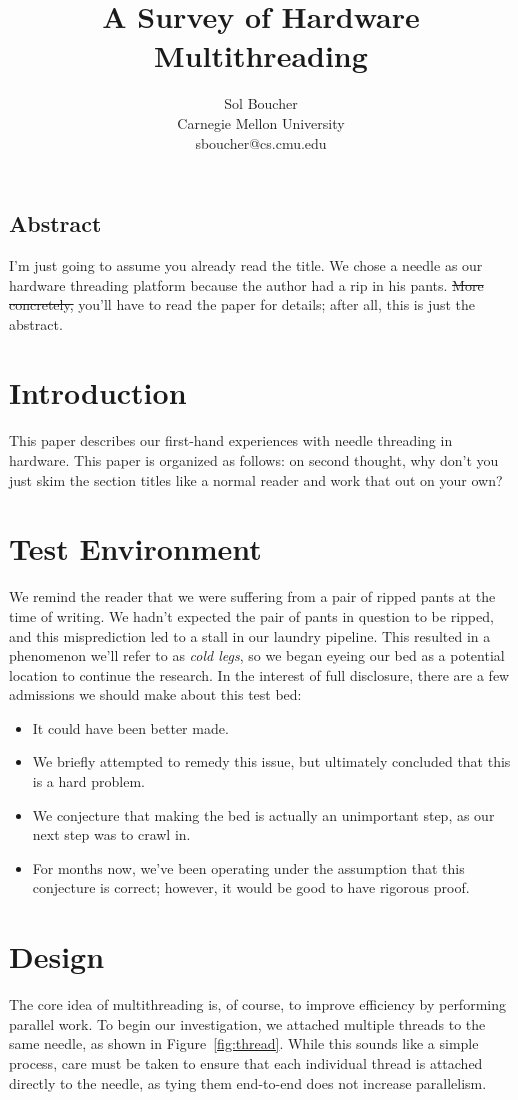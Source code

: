 \documentclass[letterpaper,twocolumn,12pt]{article}
\title{A Survey of Hardware Multithreading}
\author{Sol Boucher \\ Carnegie Mellon University \\ sboucher@cs.cmu.edu}
\date{}
\begin{document}
\maketitle
\thispagestyle{empty}

\subsection*{Abstract}
I'm just going to assume you already read the title.
We chose a needle as our hardware threading platform because the author had a rip in his pants.
\sout{More concretely,} you'll have to read the paper for details; after all, this is just the abstract.

\section{Introduction}
This paper describes our first-hand experiences with needle threading in hardware.
This paper is organized as follows:\@
on second thought, why don't you just skim the section titles like a normal reader and work that out on your own?

\section{Test Environment}
We remind the reader that we were suffering from a pair of ripped pants at the time of writing.
We hadn't expected the pair of pants in question to be ripped, and this misprediction led to a stall in our laundry pipeline.
This resulted in a phenomenon we'll refer to as \textit{cold legs}, so we began eyeing our bed as a potential location to continue the research.
In the interest of full disclosure, there are a few admissions we should make about this test bed:
\pagebreak
\begin{itemize}
\item It could have been better made.
\item We briefly attempted to remedy this issue, but ultimately concluded that this is a hard problem.
\item We conjecture that making the bed is actually an unimportant step, as our next step was to crawl in.
\item For months now, we've been operating under the assumption that this conjecture is correct; however, it would be good to have rigorous proof.
\end{itemize}

\section{Design}
The core idea of multithreading is, of course, to improve efficiency by performing parallel work.
To begin our investigation, we attached multiple threads to the same needle, as shown in Figure~\ref{fig:thread}.
While this sounds like a simple process, care must be taken to ensure that each individual thread is attached directly to the needle, as tying them end-to-end does not increase parallelism.
\end{document}
